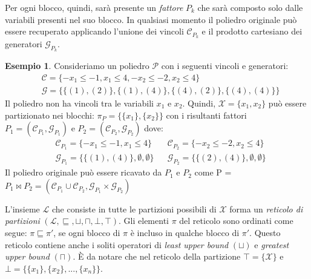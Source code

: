 \documentclass{mimosis}
\theoremstyle{definition}
\newtheorem{exmp}{Esempio}[section]
\begin{document}
Per ogni blocco, quindi, sarà presente un \emph{fattore} \(P_k\) che sarà composto solo
dalle variabili presenti nel suo blocco. In qualsiasi momento il poliedro
originale può essere recuperato applicando l'unione dei vincoli
\(\mathcal{C}_{P_k}\) e il prodotto cartesiano dei generatori \(\mathcal{G}_{P_k}\).

\begin{exmp}
  Consideriamo un poliedro $\mathcal{P}$ con i seguenti vincoli e generatori:
  \begin{align*}
    &\mathcal{C} = \{-x_{1} \le -1, x_{1} \le 4, -x_{2} \le -2, x_{2} \le 4\} \\
    &\mathcal{G} = \{\{(1),(2)\}, \{(1),(4)\}, \{(4),(2)\}, \{(4),(4)\}\}
  \end{align*}
  Il poliedro non ha vincoli tra le variabili $x_1$ e $x_2$. Quindi, $\mathcal{X} = \{x_1,x_2\}$
  può essere partizionato nei blocchi: $\pi_P = \{\{x_1\}, \{x_2\}\}$ con i risultanti fattori
  $P_1 = (\mathcal{C}_{P_1}, \mathcal{G}_{P_1})$ e $P_2 = (\mathcal{C}_{P_2}, \mathcal{G}_{P_2})$ dove:
  \begin{align*}
      &\mathcal{C}_{P_{1}} = \{-x_{1} \le -1, x_{1} \le 4\}  &&\mathcal{C}_{P_{2}} = \{ -x_{2} \le -2, x_{2} \le 4\} \\
      &\mathcal{G}_{P_{1}} = \{\{(1),(4)\}, \emptyset, \emptyset \} &&\mathcal{G}_{P_{2}} = \{\{(2),(4)\}, \emptyset, \emptyset \}
  \end{align*}
  Il poliedro originale può essere ricavato da $P_{1}$ e $P_{2}$ come
  P = $P_{1} \bowtie P_{2} = (\mathcal{C}_{P_{1}} \cup \mathcal{C}_{P_{2}}, \mathcal{G}_{P_{1}} \times \mathcal{G}_{P_{2}})$
\end{exmp}

L'insieme \(\mathcal{L}\) che consiste in tutte le partizioni possibili di \(\mathcal{X}\)
forma un \emph{reticolo di partizioni} \((\mathcal{L}, \sqsubseteq, \sqcup, \sqcap,
\bot, \top)\). Gli elementi \(\pi\) del reticolo sono ordinati come segue: \(\pi
\sqsubseteq \pi'\), se ogni blocco di \(\pi\) è incluso in qualche blocco di
\(\pi'\). Questo reticolo contiene anche i soliti operatori di \emph{least upper bound}
\((\sqcup)\) e \emph{greatest upper bound} \((\sqcap)\). È da notare che nel reticolo della
partizione \(\top = \{\mathcal{X}\}\) e \(\bot = \{\{x_1\}, \{x_2\}, ..., \{x_n\}\}\).
\end{document}
